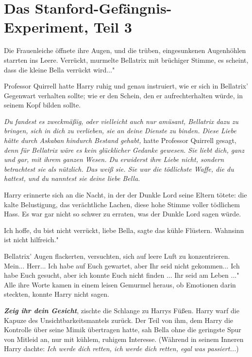 \chapter{Das Stanford-Gefängnis-Experiment, Teil 3}

Die Frauenleiche öffnete ihre Augen, und die trüben, eingesunkenen Augenhöhlen
starrten ins Leere. \glqq{}Verrückt\grqq{}, murmelte Bellatrix mit brüchiger
Stimme, \glqq{}es scheint, dass die kleine Bella verrückt wird..."

Professor Quirrell hatte Harry ruhig und genau instruiert, wie er sich in
Bellatrix' Gegenwart verhalten sollte; wie er den Schein, den er
aufrechterhalten würde, in seinem Kopf bilden sollte.

\emph{Du fandest es zweckmäßig, oder vielleicht auch nur amüsant, Bellatrix dazu
zu bringen, sich in dich zu verlieben, sie an deine Dienste zu binden. Diese
Liebe hätte durch Askaban hindurch Bestand gehabt,} hatte Professor Quirrell
gesagt, \emph{denn für Bellatrix wäre es kein glücklicher Gedanke gewesen. Sie
liebt dich, ganz und gar, mit ihrem ganzen Wesen. Du erwiderst ihre Liebe nicht,
sondern betrachtest sie als nützlich. Das weiß sie. Sie war die tödlichste
Waffe, die du hattest, und du nanntest sie deine liebe Bella.}

Harry erinnerte sich an die Nacht, in der der Dunkle Lord seine Eltern tötete:
die kalte Belustigung, das verächtliche Lachen, diese hohe Stimme voller
tödlichem Hass. Es war gar nicht so schwer zu erraten, was der Dunkle Lord sagen
würde.

\glqq{}Ich hoffe, du bist nicht verrückt, liebe Bella\grqq{}, sagte das kühle
Flüstern. \glqq{}Wahnsinn ist nicht hilfreich."

Bellatrix' Augen flackerten, versuchten, sich auf leere Luft zu konzentrieren.
\glqq{}Mein... Herr... Ich habe auf Euch gewartet, aber Ihr seid nicht
gekommen... Ich habe Euch gesucht, aber ich konnte Euch nicht finden ... Ihr
seid am Leben ..." Alle ihre Worte kamen in einem leisen Gemurmel heraus, ob
Emotionen darin steckten, konnte Harry nicht sagen.

\glqq{}\textbf{\emph{Zeig ihr dein Gesicht}}\grqq{}, zischte die Schlange zu
Harrys Füßen. Harry warf die Kapuze des Unsichtbarkeitsmantels zurück. Der Teil
von ihm, dem Harry die Kontrolle über seine Mimik übertragen hatte, sah Bella
ohne die geringste Spur von Mitleid an, nur mit kühlem, ruhigem Interesse.
(Während in seinem Inneren Harry dachte:\emph{ Ich werde dich retten, ich werde
dich retten, egal was passiert...})


